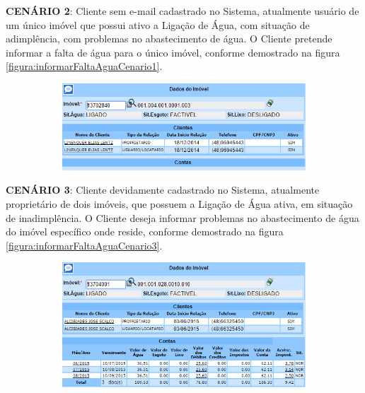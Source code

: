 \begin{flushleft}
	\begin{description}
		\item \textbf{CENÁRIO 2}: Cliente sem e-mail cadastrado no Sistema, atualmente usuário de um único imóvel que possui ativo a Ligação de Água, com situação de adimplência, com problemas no abastecimento de água. O Cliente pretende informar a falta de água para o único imóvel, conforme demostrado na figura \ref{figura:informarFaltaAguaCenario1}.
		\begin{figure}[H]
			\centering
			\caption{Informar Falta de Água - Cenário de Teste 2}
			\label{figura:informarFaltaAguaCenario2}
			\begin{subfigure}[H]{\textwidth}
				\centering
				\includegraphics{figuras/cenarios/informar_falta_agua/cenario_2.PNG}
			\end{subfigure}
		\end{figure}	
	\end{description}
	
	\begin{description}
		\item \textbf{CENÁRIO 3}: Cliente devidamente cadastrado no Sistema, atualmente proprietário de dois imóveis, que possuem a Ligação de Água ativa, em situação de inadimplência. O Cliente deseja informar problemas no abastecimento de água do imóvel específico onde reside, conforme demostrado na figura \ref{figura:informarFaltaAguaCenario3}.
		\begin{figure}[H]
			\centering
			\caption{Informar Falta de Água - Cenário de Teste 3}
			\label{figura:informarFaltaAguaCenario3}
			\begin{subfigure}[H]{\textwidth}
				\centering
				\includegraphics{figuras/cenarios/informar_falta_agua/cenario_3.PNG}
				\legend {\fontsize{10}{12}\selectfont {Fonte: Autoria Própria}.}	
			\end{subfigure}
		\end{figure}
	\end{description}
\end{flushleft}	

